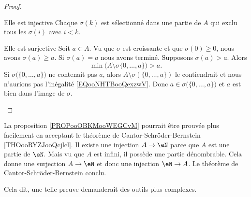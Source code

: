 \begin{proof}
\begin{subproof}
        \item[Elle est injective]
            Chaque \( \sigma(k)\) est sélectionné dans une partie de \( A\) qui exclu tous les \( \sigma(i)\) avec \( i<k\).
        \item[Elle est surjective]
            Soit \( a\in A\). Vu que \( \sigma\) est croissante et que \( \sigma(0)\geq 0\), nous avons \( \sigma(a)\geq a\). Si \( \sigma(a)=a\) nous avons terminé. Supposons \( \sigma(a)>a\). Alors
            \begin{equation}        \label{EQooNHTBooQexzwV}
                \min\big( A\setminus\sigma\{ 0,\ldots, a \} \big)>a.
            \end{equation}
            Si \( \sigma\big( \{ 0,\ldots, a \} \big)\) ne contenait pas \( a\), alors \( A\setminus \sigma(\{ 0,\ldots, a \})\) le contiendrait et nous n'aurions pas l'inégalité \eqref{EQooNHTBooQexzwV}. Donc \( a\in \sigma\big( \{ 0,\ldots, a \} \big)\) et \( a\) est bien dans l'image de \( \sigma\).
    \end{subproof}
\end{proof}

\begin{normaltext}
    La proposition \ref{PROPooOBKMooWEGCvM} pourrait être prouvée plus facilement en acceptant le théorème de Cantor-Schröder-Bernstein \ref{THOooRYZJooQcjlcl}. Il existe une injection \( A\to \eN\) parce que \( A\) est une partie de \( \eN\). Mais vu que \( A\) est infini, il possède une partie dénombrable. Cela donne une surjection \( A\to \eN\) et donc une injection \( \eN\to A\). Le théorème de Cantor-Schröder-Bernstein conclu.

    Cela dit, une telle preuve demanderait des outils plus complexes.
\end{normaltext}


